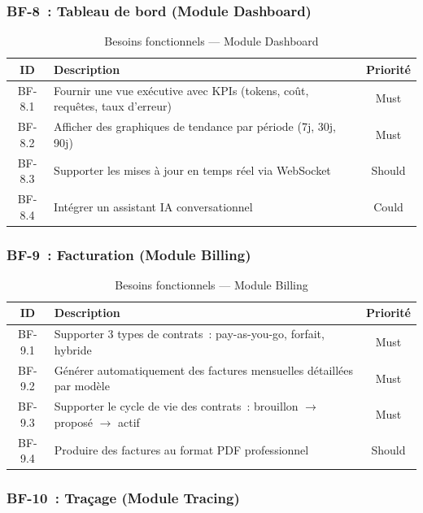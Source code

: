 \subsubsection{BF-8~: Tableau de bord (Module Dashboard)}

\begin{table}[H]
\centering
\caption{Besoins fonctionnels --- Module Dashboard}
\label{tab:bf_dashboard}
\begin{tabularx}{\textwidth}{|c|X|c|}
\hline
\textbf{ID} & \textbf{Description} & \textbf{Priorité} \\
\hline
BF-8.1 & Fournir une vue exécutive avec KPIs (tokens, coût, requêtes, taux d'erreur) & Must \\
\hline
BF-8.2 & Afficher des graphiques de tendance par période (7j, 30j, 90j) & Must \\
\hline
BF-8.3 & Supporter les mises à jour en temps réel via WebSocket & Should \\
\hline
BF-8.4 & Intégrer un assistant IA conversationnel & Could \\
\hline
\end{tabularx}
\end{table}

\subsubsection{BF-9~: Facturation (Module Billing)}

\begin{table}[H]
\centering
\caption{Besoins fonctionnels --- Module Billing}
\label{tab:bf_billing}
\begin{tabularx}{\textwidth}{|c|X|c|}
\hline
\textbf{ID} & \textbf{Description} & \textbf{Priorité} \\
\hline
BF-9.1 & Supporter 3 types de contrats~: pay-as-you-go, forfait, hybride & Must \\
\hline
BF-9.2 & Générer automatiquement des factures mensuelles détaillées par modèle & Must \\
\hline
BF-9.3 & Supporter le cycle de vie des contrats~: brouillon $\rightarrow$ proposé $\rightarrow$ actif & Must \\
\hline
BF-9.4 & Produire des factures au format PDF professionnel & Should \\
\hline
\end{tabularx}
\end{table}

\subsubsection{BF-10~: Traçage (Module Tracing)}


